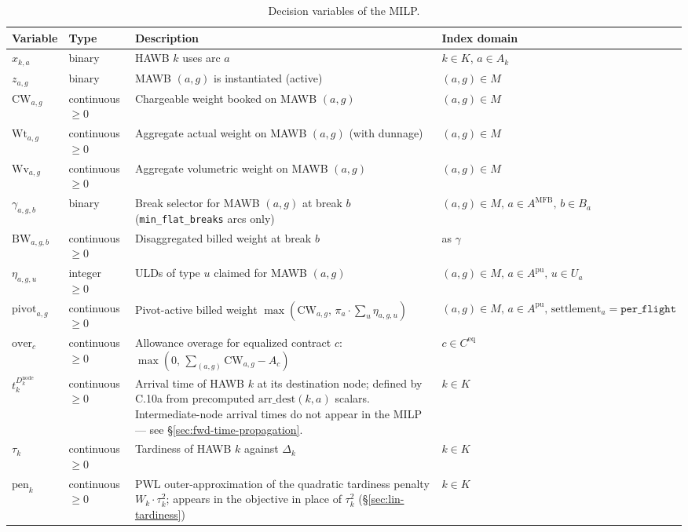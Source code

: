 \documentclass[11pt,a4paper]{article}
\theoremstyle{definition}
\begin{document}
\begin{table}[H]
\centering
\caption{Decision variables of the MILP.}
\label{tab:decision-variables}
\begin{tabular}{p{3.5cm}p{2.5cm}p{6cm}p{1.5cm}}
\toprule
Variable & Type & Description & Index domain \\
\midrule
$x_{k,a}$ & binary & HAWB $k$ uses arc $a$ & $k \in K$, $a \in A_k$ \\
$z_{a,g}$ & binary & MAWB $(a, g)$ is instantiated (active) & $(a, g) \in M$ \\
$\text{CW}_{a,g}$ & continuous $\geq 0$ & Chargeable weight booked on MAWB $(a, g)$ & $(a, g) \in M$ \\
$\text{Wt}_{a,g}$ & continuous $\geq 0$ & Aggregate actual weight on MAWB $(a, g)$ (with dunnage) & $(a, g) \in M$ \\
$\text{Wv}_{a,g}$ & continuous $\geq 0$ & Aggregate volumetric weight on MAWB $(a, g)$ & $(a, g) \in M$ \\
$\gamma_{a,g,b}$ & binary & Break selector for MAWB $(a, g)$ at break $b$ (\texttt{min\_flat\_breaks} arcs only) & $(a, g) \in M,\, a \in A^{\text{MFB}},\, b \in B_a$ \\
$\text{BW}_{a,g,b}$ & continuous $\geq 0$ & Disaggregated billed weight at break $b$ & as $\gamma$ \\
$\eta_{a,g,u}$ & integer $\geq 0$ & ULDs of type $u$ claimed for MAWB $(a, g)$ & $(a, g) \in M,\, a \in A^{\text{pu}},\, u \in U_a$ \\
$\text{pivot}_{a,g}$ & continuous $\geq 0$ & Pivot-active billed weight $\max(\text{CW}_{a,g},\, \pi_a \cdot \sum_u \eta_{a,g,u})$ & $(a, g) \in M,\, a \in A^{\text{pu}},\, \text{settlement}_a = \texttt{per\_flight}$ \\
$\text{over}_c$ & continuous $\geq 0$ & Allowance overage for equalized contract $c$: $\max(0,\, \sum_{(a,g)} \text{CW}_{a,g} - A_c)$ & $c \in C^{\text{eq}}$ \\
$t_k^{D_k^{\text{node}}}$ & continuous $\geq 0$ & Arrival time of HAWB $k$ at its destination node; defined by C.10a from precomputed $\text{arr\_dest}(k, a)$ scalars. Intermediate-node arrival times do not appear in the MILP --- see \S\ref{sec:fwd-time-propagation}. & $k \in K$ \\
$\tau_k$ & continuous $\geq 0$ & Tardiness of HAWB $k$ against $\Delta_k$ & $k \in K$ \\
$\text{pen}_k$ & continuous $\geq 0$ & PWL outer-approximation of the quadratic tardiness penalty $W_k \cdot \tau_k^2$; appears in the objective in place of $\tau_k^2$ (\S\ref{sec:lin-tardiness}) & $k \in K$ \\
\bottomrule
\end{tabular}
\end{table}
\end{document}
